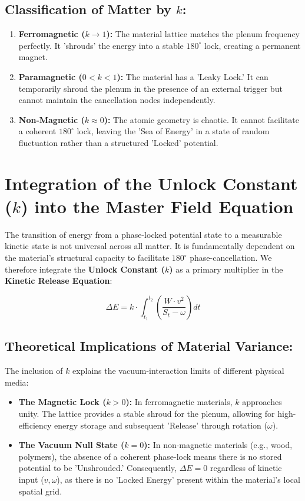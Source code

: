 \documentclass[11pt]{article}
\begin{document}
\subsection*{Classification of Matter by $k$:}
\begin{enumerate}
    \item \textbf{Ferromagnetic ($k \to 1$):} The material lattice matches the plenum frequency perfectly. It 'shrouds' the energy into a stable $180^\circ$ lock, creating a permanent magnet.
    \item \textbf{Paramagnetic ($0 < k < 1$):} The material has a 'Leaky Lock.' It can temporarily shroud the plenum in the presence of an external trigger but cannot maintain the cancellation nodes independently.
    \item \textbf{Non-Magnetic ($k \approx 0$):} The atomic geometry is chaotic. It cannot facilitate a coherent $180^\circ$ lock, leaving the 'Sea of Energy' in a state of random fluctuation rather than a structured 'Locked' potential.
\end{enumerate}

\section*{Integration of the Unlock Constant ($k$) into the Master Field Equation}

The transition of energy from a phase-locked potential state to a measurable kinetic state is not universal across all matter. It is fundamentally dependent on the material's structural capacity to facilitate $180^\circ$ phase-cancellation. We therefore integrate the \textbf{Unlock Constant ($k$)} as a primary multiplier in the \textbf{Kinetic Release Equation}:

\begin{equation}
    \Delta E = k \cdot \int_{t_1}^{t_2} \left( \frac{W \cdot v^2}{S_t - \omega} \right) dt
\end{equation}

\subsection*{Theoretical Implications of Material Variance:}
The inclusion of $k$ explains the vacuum-interaction limits of different physical media:

\begin{itemize}
    \item \textbf{The Magnetic Lock ($k > 0$):} In ferromagnetic materials, $k$ approaches unity. The lattice provides a stable shroud for the plenum, allowing for high-efficiency energy storage and subsequent 'Release' through rotation ($\omega$).
    
    \item \textbf{The Vacuum Null State ($k = 0$):} In non-magnetic materials (e.g., wood, polymers), the absence of a coherent phase-lock means there is no stored potential to be 'Unshrouded.' Consequently, $\Delta E = 0$ regardless of kinetic input ($v, \omega$), as there is no 'Locked Energy' present within the material's local spatial grid.
\end{itemize}
\end{document}
